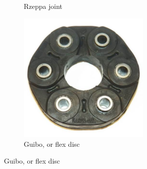 \begin{figure}[H]
\begin{subfigure}[b]{.24\linewidth}
			\caption{Rzeppa joint}
		\end{subfigure}
		\begin{subfigure}[b]{.24\linewidth}
			\includegraphics[width=0.7\textwidth]{imgs/coupling_guibo.jpeg}
			\caption{Guibo, or flex disc}
		\end{subfigure}
	\end{figure}


